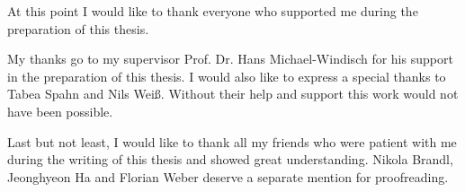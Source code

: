\thispagestyle{plain}

At this point I would like to thank everyone who supported me during the preparation of this thesis.

My thanks go to my supervisor Prof. Dr. Hans Michael-Windisch for his support in the preparation of this thesis. I would also like to express a special thanks to Tabea Spahn and Nils Weiß. Without their help and support this work would not have been possible.

Last but not least, I would like to thank all my friends who were patient with me during the writing of this thesis and showed great understanding. Nikola Brandl, Jeonghyeon Ha and Florian Weber deserve a separate mention for proofreading.
